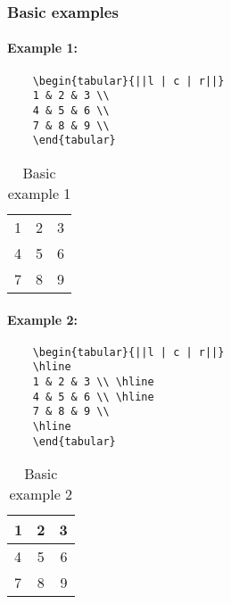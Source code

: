 \subsubsection{Basic examples}

\paragraph{Example 1:}

\begin{verbatim}
	\begin{tabular}{||l | c | r||}
	1 & 2 & 3 \\
	4 & 5 & 6 \\
	7 & 8 & 9 \\
	\end{tabular}
\end{verbatim}

\begin{table}[htbp]
	\centering
	\begin{tabular}{||l | c | r||}
	1 & 2 & 3 \\
	4 & 5 & 6 \\
	7 & 8 & 9 \\
	\end{tabular}
	\caption{Basic example 1}
	\label{tablebasic1}
\end{table}


\paragraph{Example 2:}

\begin{verbatim}
	\begin{tabular}{||l | c | r||}
	\hline
	1 & 2 & 3 \\ \hline
	4 & 5 & 6 \\ \hline
	7 & 8 & 9 \\
	\hline
	\end{tabular}
\end{verbatim}

\begin{table}[htbp]
	\centering
	\begin{tabular}{||l | c | r||}
	\hline
	1 & 2 & 3 \\ \hline
	4 & 5 & 6 \\ \hline
	7 & 8 & 9 \\
	\hline
	\end{tabular}
	\caption{Basic example 2}
	\label{tablebasic2}
\end{table}

